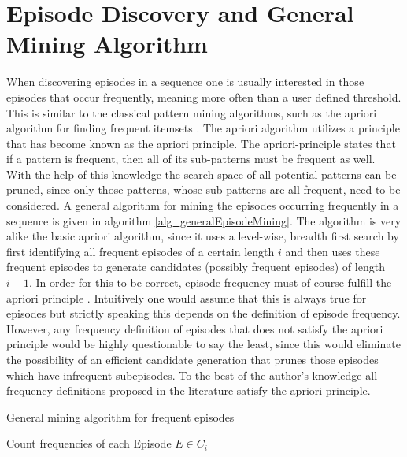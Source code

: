 \section{Episode Discovery and General Mining Algorithm}
\label{sec_episodeDiscovery}
When discovering episodes in a sequence one is usually interested in those episodes that occur frequently, meaning more often than a user defined threshold. This is similar to the classical pattern mining algorithms, such as the apriori algorithm for finding frequent itemsets \cite{agrawal1994fast}. The apriori algorithm utilizes a principle that has become known as the apriori principle. The apriori-principle states that if a pattern is frequent, then all of its sub-patterns must be frequent as well. With the help of this knowledge the search space of all potential patterns can be pruned, since only those patterns, whose sub-patterns are all frequent, need to be considered. A general algorithm for mining the episodes occurring frequently in a sequence is given in algorithm \ref{alg_generalEpisodeMining}. The algorithm is very alike the basic apriori algorithm, since it uses a level-wise, breadth first search by first identifying all frequent episodes of a certain length $i$ and then uses these frequent episodes to generate candidates (possibly frequent episodes) of length $i+1$. In order for this to be correct, episode frequency must of course fulfill the apriori principle \cite{agrawal1994fast}. Intuitively one would assume that this is always true for episodes but strictly speaking this depends on the definition of episode frequency. However, any frequency definition of episodes that does not satisfy the apriori principle would be highly questionable to say the least, since this would eliminate the possibility of an efficient candidate generation that prunes those episodes which have infrequent subepisodes. To the best of the author's knowledge all frequency definitions proposed in the literature satisfy the apriori principle.\newline

\begin{algorithm}[H]
  \caption{General mining algorithm for frequent episodes
    \label{alg_generalEpisodeMining}}
  \begin{algorithmic}[1]
    \Statex
      	\State Count frequencies of each Episode $E \in C_i$
      \EndWhile
      \State {}
    \EndFunction
  \end{algorithmic}
\end{algorithm}


